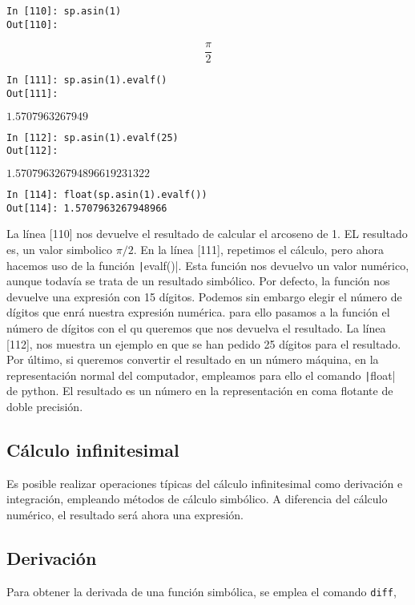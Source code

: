 \begin{center}
	\begin{minipage}{.5\textwidth}
		\begin{verbatim}
In [110]: sp.asin(1)
Out[110]: 
\end{verbatim}
		\begin{equation*} \frac{\pi}{2}\end{equation*}
	\begin{verbatim}
In [111]: sp.asin(1).evalf()
Out[111]: 
\end{verbatim}
$1.5707963267949$
	\begin{verbatim}
In [112]: sp.asin(1).evalf(25)
Out[112]:
\end{verbatim}
$1.570796326794896619231322$
	\begin{verbatim}
In [114]: float(sp.asin(1).evalf())
Out[114]: 1.5707963267948966
\end{verbatim}
\end{minipage}
\end{center}
\begin{paracol}{2}
La línea [110] nos devuelve el resultado de calcular el arcoseno de 1. EL resultado es, un valor simbolico $\pi/2$. En la línea [111], repetimos el cálculo, pero ahora hacemos uso de la función \texttt|evalf()|. Esta función nos devuelvo un valor numérico, aunque todavía se trata de un resultado simbólico. Por defecto, la función nos devuelve una expresión con 15 dígitos. Podemos sin embargo elegir el número de dígitos que enrá nuestra expresión numérica. para ello pasamos a la función el número de dígitos con el qu queremos que nos devuelva el resultado. La línea [112], nos muestra un ejemplo en que se han pedido 25 dígitos para el resultado. Por último, si queremos convertir el resultado en un número máquina, en la representación normal del computador, empleamos para ello el comando \texttt|float| de python. El resultado es un número en la representación en coma flotante de doble precisión.
\end{paracol}
\begin{paracol}{2}
\section{Cálculo infinitesimal}
Es posible realizar operaciones típicas del cálculo infinitesimal como derivación e integración, empleando métodos de cálculo simbólico. A diferencia del cálculo numérico, el resultado será ahora una expresión. 

\subsection{Derivación}
Para obtener la derivada de una función simbólica, se emplea el comando \texttt{diff},
\end{paracol}

